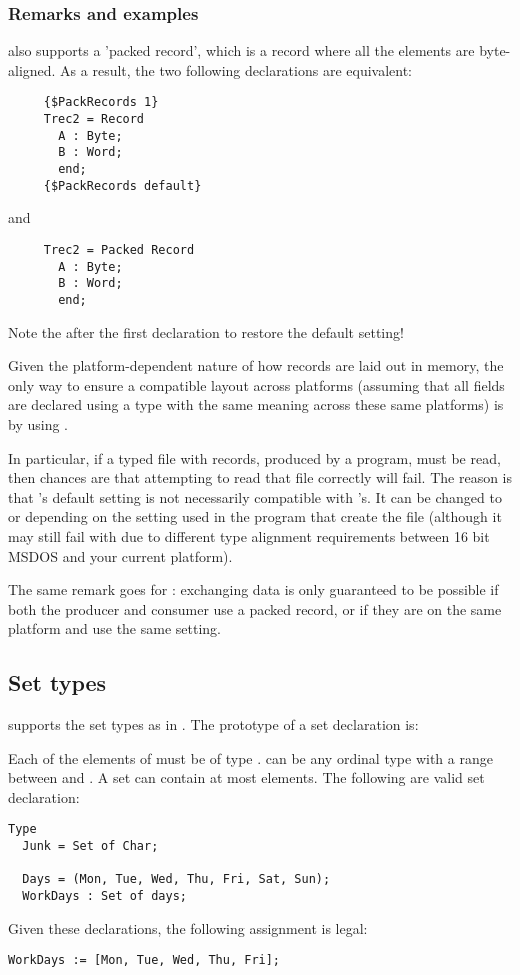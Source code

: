 \subsubsection{Remarks and examples}

\fpc also supports a 'packed record', which is a record where all the
elements are byte-aligned. As a result, the two following declarations
are equivalent:
\begin{verbatim}
     {$PackRecords 1}
     Trec2 = Record
       A : Byte;
       B : Word;
       end;
     {$PackRecords default}
\end{verbatim}
and
\begin{verbatim}
     Trec2 = Packed Record
       A : Byte;
       B : Word;
       end;
\end{verbatim}
Note the  after the first declaration to
restore the default setting!

Given the platform-dependent nature of how records are laid out in
memory, the only way to ensure a compatible layout across platforms
(assuming that all fields are declared using a type with the same
meaning across these same platforms) is by using .

In particular, if a typed file with records, produced by a \tp program,
must be read, then chances are that attempting to read that file
correctly will fail. The reason is that \fpc{}'s default
 setting is not necessarily compatible with
\tp{}'s. It can be changed to  or
 depending on the setting used in the \tp
program that create the file (although it may still fail with
 due to different type alignment requirements
between 16 bit MSDOS and your current platform).

The same remark goes for \delphi{}: exchanging data is only guaranteed
to be possible if both the producer and consumer use a packed record, or
if they are on the same platform and use the same  setting.


%
\subsection{Set types}
\fpc supports the set types as in \tp. The prototype of a set
declaration is:

Each of the elements of  must be of type .
 can be any ordinal type with a range between  and
. A set can contain at most  elements.
The following are valid set declaration:
\begin{verbatim}
Type
  Junk = Set of Char;

  Days = (Mon, Tue, Wed, Thu, Fri, Sat, Sun);
  WorkDays : Set of days;
\end{verbatim}
Given these declarations, the following assignment is legal:
\begin{verbatim}
WorkDays := [Mon, Tue, Wed, Thu, Fri];
\end{verbatim}

